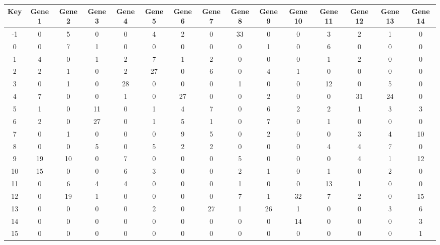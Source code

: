 \begin{tabular}{|c|c|c|c|c|c|c|c|c|c|c|c|c|c|c|}
\hline
Key & Gene 1 & Gene 2 & Gene 3 & Gene 4 & Gene 5 & Gene 6 & Gene 7 & Gene 8 & Gene 9 & Gene 10 & Gene 11 & Gene 12 & Gene 13 & Gene 14 \\
\hline
-1 & 0 & 5 & 0 & 0 & 4 & 2 & 0 & 33 & 0 & 0 & 3 & 2 & 1 & 0 \\
0 & 0 & 7 & 1 & 0 & 0 & 0 & 0 & 0 & 1 & 0 & 6 & 0 & 0 & 0 \\
1 & 4 & 0 & 1 & 2 & 7 & 1 & 2 & 0 & 0 & 0 & 1 & 2 & 0 & 0 \\
2 & 2 & 1 & 0 & 2 & 27 & 0 & 6 & 0 & 4 & 1 & 0 & 0 & 0 & 0 \\
3 & 0 & 1 & 0 & 28 & 0 & 0 & 0 & 1 & 0 & 0 & 12 & 0 & 5 & 0 \\
4 & 7 & 0 & 0 & 1 & 0 & 27 & 0 & 0 & 2 & 0 & 0 & 31 & 24 & 0 \\
5 & 1 & 0 & 11 & 0 & 1 & 4 & 7 & 0 & 6 & 2 & 2 & 1 & 3 & 3 \\
6 & 2 & 0 & 27 & 0 & 1 & 5 & 1 & 0 & 7 & 0 & 1 & 0 & 0 & 0 \\
7 & 0 & 1 & 0 & 0 & 0 & 9 & 5 & 0 & 2 & 0 & 0 & 3 & 4 & 10 \\
8 & 0 & 0 & 5 & 0 & 5 & 2 & 2 & 0 & 0 & 0 & 4 & 4 & 7 & 0 \\
9 & 19 & 10 & 0 & 7 & 0 & 0 & 0 & 5 & 0 & 0 & 0 & 4 & 1 & 12 \\
10 & 15 & 0 & 0 & 6 & 3 & 0 & 0 & 2 & 1 & 0 & 1 & 0 & 2 & 0 \\
11 & 0 & 6 & 4 & 4 & 0 & 0 & 0 & 1 & 0 & 0 & 13 & 1 & 0 & 0 \\
12 & 0 & 19 & 1 & 0 & 0 & 0 & 0 & 7 & 1 & 32 & 7 & 2 & 0 & 15 \\
13 & 0 & 0 & 0 & 0 & 2 & 0 & 27 & 1 & 26 & 1 & 0 & 0 & 3 & 6 \\
14 & 0 & 0 & 0 & 0 & 0 & 0 & 0 & 0 & 0 & 14 & 0 & 0 & 0 & 3 \\
15 & 0 & 0 & 0 & 0 & 0 & 0 & 0 & 0 & 0 & 0 & 0 & 0 & 0 & 1 \\
\hline
\end{tabular}